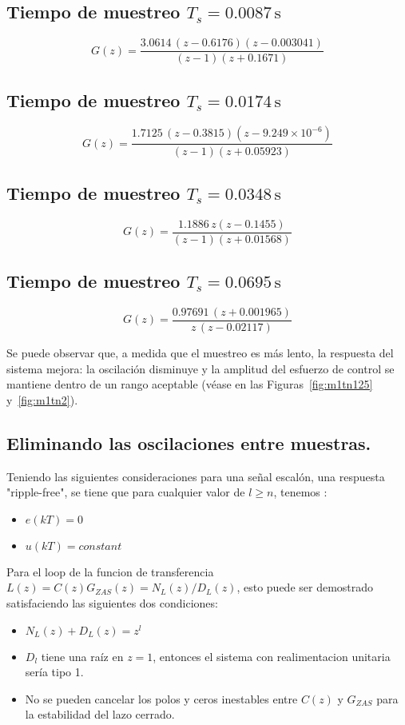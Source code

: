\subsection*{Tiempo de muestreo $T_s = 0.0087 \, \text{s}$}
\[
G(z) = \frac{3.0614 \, (z - 0.6176)(z - 0.003041)}{(z - 1)(z + 0.1671)}
\]
\subsection*{Tiempo de muestreo $T_s = 0.0174 \, \text{s}$}
\[
G(z) = \frac{1.7125 \, (z - 0.3815)(z - 9.249 \times 10^{-6})}{(z - 1)(z + 0.05923)}
\]

\subsection*{Tiempo de muestreo $T_s = 0.0348 \, \text{s}$}
\[
G(z) = \frac{1.1886 \, z(z - 0.1455)}{(z - 1)(z + 0.01568)}
\]

\subsection*{Tiempo de muestreo $T_s = 0.0695 \, \text{s}$}
\[
G(z) = \frac{0.97691 \, (z + 0.001965)}{z \, (z - 0.02117)}
\]

Se puede observar que, a medida que el muestreo es más lento, la respuesta del sistema mejora: la oscilación disminuye y la amplitud del esfuerzo de control se mantiene dentro de un rango aceptable (véase en las Figuras~\ref{fig:m1tn125} y~\ref{fig:m1tn2}).

\subsection{Eliminando las oscilaciones entre muestras.}

Teniendo las siguientes consideraciones para una señal escalón, una respuesta "ripple-free", se tiene que para cualquier valor de $l \ge n$, tenemos :

\begin{itemize}
	\item $e(kT) = 0$
	\item $u(kT) = constant$
\end{itemize}

Para el loop de la funcion de transferencia $L(z) = C(z)G_{ZAS}(z) = N_L(z)/D_L(z)$, esto puede ser demostrado satisfaciendo las siguientes dos condiciones:
\begin{itemize}
	\item $N_L(z)+D_L(z)=z^l$
	\item $D_l$ tiene una raíz en $z=1$, entonces el sistema con realimentacion unitaria sería tipo 1.
	\item No se pueden cancelar los polos y ceros inestables entre $C(z)$ y $G_{ZAS}$ para la estabilidad del lazo cerrado.
\end{itemize}
